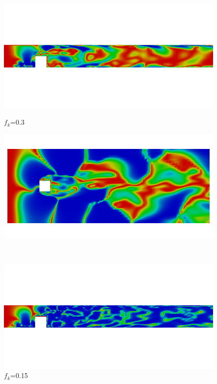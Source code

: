 \begin{figure}[H]
\ContinuedFloat
\begin{minipage}[b]{0.5\linewidth}
\includegraphics[scale=0.25]{figure/fine/three/fkout_z.png}
\caption*{$f_k$=0.3}
\end{minipage}
\begin{minipage}[b]{0.5\linewidth}
\includegraphics[scale=0.25]{figure/fine/three/fkout_y.png}
\caption*{}
\end{minipage}\\
\begin{minipage}[b]{0.5\linewidth}
\includegraphics[scale=0.25]{figure/fine/one/fkout_z.png}
\caption*{$f_k$=0.15}

\end{minipage}
\end{figure}
